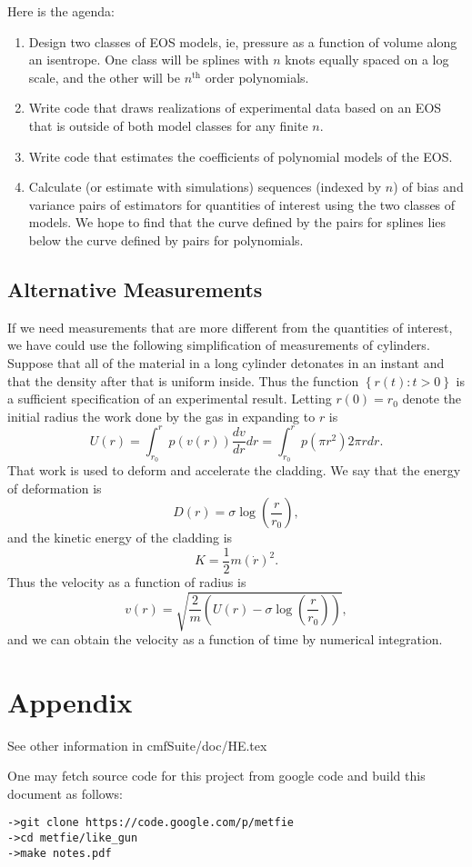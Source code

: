 \documentclass[11pt]{article}
\begin{document}
Here is the agenda:
\begin{enumerate}
\item Design two classes of EOS models, ie, pressure as a function of
  volume along an isentrope.  One class will be splines with $n$ knots
  equally spaced on a log scale, and the other will be $n^{\text{th}}$
  order polynomials.
\item Write code that draws realizations of experimental data based on
  an EOS that is outside of both model classes for any finite $n$.
\item Write code that estimates the coefficients of polynomial models
  of the EOS.
\item Calculate (or estimate with simulations) sequences (indexed by
  $n$) of bias and variance pairs of estimators for quantities of
  interest using the two classes of models.  We hope to find that the
  curve defined by the pairs for splines lies below the curve defined
  by pairs for polynomials.
\end{enumerate}

\subsection{Alternative Measurements}
\label{sec:alternative}

If we need measurements that are more different from the quantities of
interest, we have could use the following simplification of
measurements of cylinders.  Suppose that all of the material in a long
cylinder detonates in an instant and that the density after that is
uniform inside.  Thus the function $\left\{r(t): t>0 \right\}$ is a
sufficient specification of an experimental result.  Letting
$r(0) = r_0$ denote the initial radius the work done by the gas in
expanding to $r$ is
\begin{equation*}
  U(r) = \int_{r_0}^r p(v(r)) \frac{dv}{dr} dr = \int_{r_0}^r p(\pi
  r^2) 2\pi r dr.
\end{equation*}
That work is used to deform and accelerate the cladding.  We say that
the energy of deformation is
\begin{equation*}
  D(r) = \sigma \log \left(\frac{r}{r_0} \right),
\end{equation*}
and the kinetic energy of the cladding is
\begin{equation*}
  K = \frac{1}{2} m \left( \dot r \right)^2.
\end{equation*}
Thus the velocity as a function of radius is
\begin{equation*}
  v(r) = \sqrt{\frac{2}{m} \left( U(r) - \sigma \log
      \left(\frac{r}{r_0} \right) \right) },
\end{equation*}
and we can obtain the velocity as a function of time by numerical
integration.

\section*{Appendix}
\label{sec:appendix}

See other information in cmfSuite/doc/HE.tex

One may fetch source code for this project from google code and build
this document as follows:
\begin{verbatim}
->git clone https://code.google.com/p/metfie
->cd metfie/like_gun
->make notes.pdf
\end{verbatim}
\end{document}
